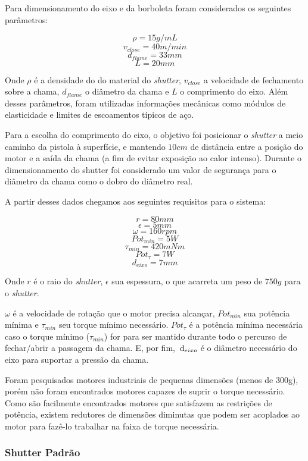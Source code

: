 Para dimensionamento do eixo e da borboleta foram considerados os seguintes
parâmetros:

\[\rho = 15 g/mL\]
\[v_{close} = 40 m/min\]
\[d_{flame} = 33mm\]
\[L = 20mm\]

Onde $\rho$ é a densidade do do material do \textit{shutter}, $v_{close}$ a
velocidade de fechamento sobre a chama, $d_{flame}$ o diâmetro da chama e $L$ o
comprimento do eixo. Além desses parâmetros, foram utilizadas informações
mecânicas como módulos de elasticidade e limites de escoamentos típicos de aço.

Para a escolha do comprimento do eixo, o objetivo foi posicionar o
\textit{shutter} a meio caminho da pistola à superfície, e mantendo $10cm$ de
distância entre a posição do motor e a saída da chama (a fim de evitar
exposição ao calor intenso). Durante o dimensionamento do shutter foi
considerado um valor de segurança para o diâmetro da chama como o dobro do
diâmetro real.

A partir desses dados chegamos aos seguintes requisitos para o sistema:

\[ r = 80 mm\]
\[ \epsilon = 5 mm\]
\[ \omega = 160 rpm\]
\[ {Pot}_{min} = 5 W \]
\[ \tau_{min} = 420 mNm \]
\[ Pot_{\tau} = 7 W \]
\[ d_{eixo} = 7 mm\]

Onde $r$ é o raio do \textit{shutter}, $\epsilon$ sua espessura, o que acarreta
um peso de $750g$ para o \textit{shutter}.

$\omega$ é a velocidade de rotação que o motor precisa alcançar, $Pot_{min}$ sua potência
mínima e $\tau_{min}$ seu torque mínimo necessário. $Pot_{\tau}$ é a potência
mínima necessária caso o torque mínimo ($\tau_{min}$) for para ser mantido
durante todo o percurso de fechar/abrir a passagem da chama. E, por fim,
$\,\mathrm{d}_{eixo}$ é o diâmetro necessário do eixo para suportar a pressão da chama. 

Foram pesquisados motores industriais de pequenas dimensões (menos de 300g),
porém não foram encontrados motores capazes de suprir o torque necessário. Como
são facilmente encontrados motores que satisfazem as restrições de potência,
existem redutores de dimensões diminutas que podem ser acoplados ao motor para
fazê-lo trabalhar na faixa de torque necessária.


\subsubsection{Shutter Padrão}